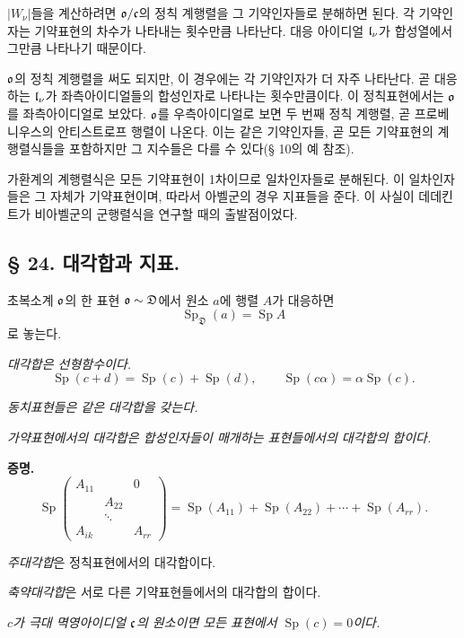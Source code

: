 \(|W_\nu|\)들을 계산하려면 \(\mathfrak o/\mathfrak c\)의 정칙 계행렬을 그 기약인자들로 분해하면 된다. 각 기약인자는 기약표현의 차수가 나타내는 횟수만큼 나타난다. 대응 아이디얼 \(\mathfrak l_\nu\)가 합성열에서 그만큼 나타나기 때문이다.

\(\mathfrak o\)의 정칙 계행렬을 써도 되지만, 이 경우에는 각 기약인자가 더 자주 나타난다. 곧 대응하는 \(\mathfrak l_\nu\)가 좌측아이디얼들의 합성인자로 나타나는 횟수만큼이다. 이 정칙표현에서는 \(\mathfrak o\)를 좌측아이디얼로 보았다. \(\mathfrak o\)를 우측아이디얼로 보면 두 번째 정칙 계행렬, 곧 프로베니우스의 \glqq{}안티스트로프 행렬\grqq{}이 나온다. 이는 같은 기약인자들, 곧 모든 기약표현의 계행렬식들을 포함하지만 그 지수들은 다를 수 있다(§ 10의 예 참조).

가환계의 계행렬식은 모든 기약표현이 1차이므로 일차인자들로 분해된다. 이 일차인자들은 그 자체가 기약표현이며, 따라서 아벨군의 경우 지표들을 준다. 이 사실이 데데킨트가 비아벨군의 군행렬식을 연구할 때의 출발점이었다.

\subsection*{§ 24. 대각합과 지표.}

초복소계 \(\mathfrak o\)의 한 표현 \(\mathfrak o\sim\mathfrak D\)에서 원소 \(a\)에 행렬 \(A\)가 대응하면
\[
        \operatorname{Sp}_{\mathfrak D}(a)=\operatorname{Sp}A
\]
로 놓는다.

\emph{대각합은 선형함수이다.}
\[
        \operatorname{Sp}(c+d)
        =\operatorname{Sp}(c)+\operatorname{Sp}(d),
        \qquad
        \operatorname{Sp}(c\alpha)
        =\alpha\operatorname{Sp}(c).
\]

\emph{동치표현들은 같은 대각합을 갖는다.}

\emph{가약표현에서의 대각합은 합성인자들이 매개하는 표현들에서의 대각합의 합이다.}

\textbf{증명.}
\[
        \operatorname{Sp}\begin{pmatrix}
        A_{11}&&0\\
        &A_{22}&\\
        &\ddots&\\
        A_{ik}&&A_{rr}
        \end{pmatrix}
        =\operatorname{Sp}(A_{11})+\operatorname{Sp}(A_{22})
        +\cdots+\operatorname{Sp}(A_{rr}).
\]

\emph{주대각합}은 정칙표현에서의 대각합이다.

\emph{축약대각합}은 서로 다른 기약표현들에서의 대각합의 합이다.

\emph{\(c\)가 극대 멱영아이디얼 \(\mathfrak c\)의 원소이면 모든 표현에서 \(\operatorname{Sp}(c)=0\)이다.}

